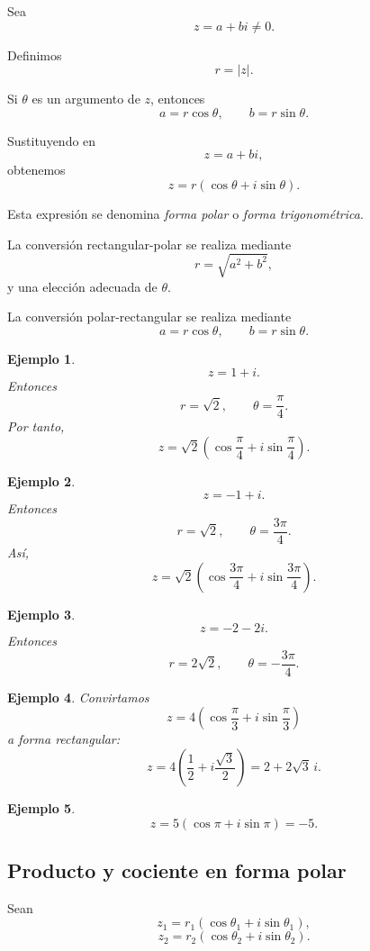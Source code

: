 \documentclass[12pt]{article}
\newtheorem{Ejem}{Ejemplo}
\begin{document}
Sea
\[
z=a+bi\neq0.
\]

Definimos
\[
r=|z|.
\]

Si $\theta$ es un argumento de $z$, entonces
\[
a=r\cos\theta,
\qquad
b=r\sin\theta.
\]

Sustituyendo en
\[
z=a+bi,
\]
obtenemos
\[
\boxed{
z
=
r(\cos\theta+i\sin\theta).
}
\]

Esta expresión se denomina \emph{forma polar} o \emph{forma trigonométrica}.

La conversión rectangular-polar se realiza mediante
\[
r=\sqrt{a^2+b^2},
\]
y una elección adecuada de $\theta$.

La conversión polar-rectangular se realiza mediante
\[
a=r\cos\theta,
\qquad
b=r\sin\theta.
\]

\begin{Ejem} \[
z=1+i.
\]
Entonces
\[
r=\sqrt2,
\qquad
\theta=\frac{\pi}{4}.
\]
Por tanto,
\[
z
=
\sqrt2
\left(
\cos\frac{\pi}{4}
+i\sin\frac{\pi}{4}
\right).
\]
\end{Ejem}

\begin{Ejem} \[
z=-1+i.
\]
Entonces
\[
r=\sqrt2,
\qquad
\theta=\frac{3\pi}{4}.
\]
Así,
\[
z
=
\sqrt2
\left(
\cos\frac{3\pi}{4}
+i\sin\frac{3\pi}{4}
\right).
\]

\end{Ejem}

\begin{Ejem} \[
z=-2-2i.
\]
Entonces
\[
r=2\sqrt2,
\qquad
\theta=-\frac{3\pi}{4}.
\]

\end{Ejem}

\begin{Ejem} Convirtamos
\[
z
=
4\left(
\cos\frac{\pi}{3}
+i\sin\frac{\pi}{3}
\right)
\]
a forma rectangular:
\[
z
=
4\left(
\frac12+i\frac{\sqrt3}{2}
\right)
=
\boxed{2+2\sqrt3\,i}.
\]

\end{Ejem}

\begin{Ejem} \[
z=5\left(\cos\pi+i\sin\pi\right)
=
-5.
\]
\end{Ejem}

\subsection*{Producto y cociente en forma polar}

Sean
\[
z_1=r_1(\cos\theta_1+i\sin\theta_1),
\]
\[
z_2=r_2(\cos\theta_2+i\sin\theta_2).
\]
\end{document}
